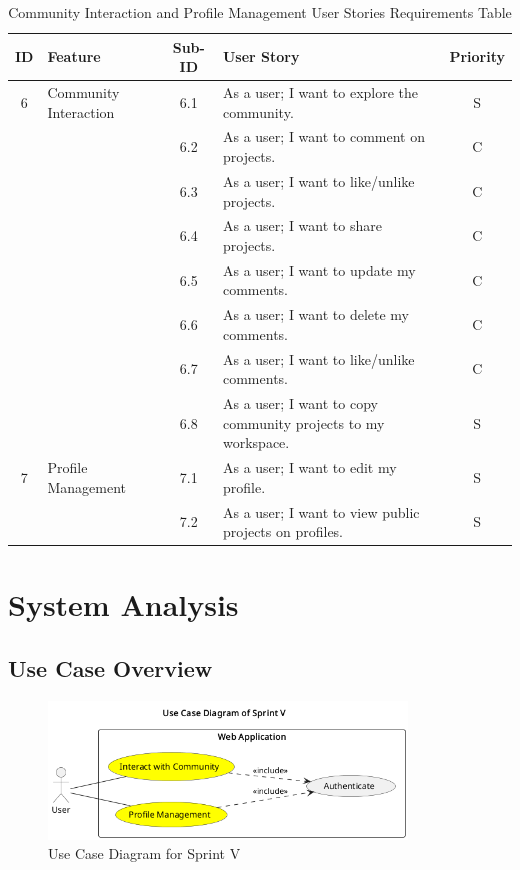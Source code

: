 \begin{table}[h]
    \centering
    \begin{tabular}{|c|l|c|p{8cm}|c|}
    \hline
    \textbf{ID} & \textbf{Feature} & \textbf{Sub-ID} & \textbf{User Story} & \textbf{Priority} \\
    \hline
    6 & Community Interaction & 6.1 & As a user; I want to explore the community. & S \\
    \hline
      &  & 6.2 & As a user; I want to comment on projects. & C \\
    \hline
      &  & 6.3 & As a user; I want to like/unlike projects. & C \\
    \hline
      &  & 6.4 & As a user; I want to share projects. & C \\
    \hline
      &  & 6.5 & As a user; I want to update my comments. & C \\
    \hline
      &  & 6.6 & As a user; I want to delete my comments. & C \\
    \hline
      &  & 6.7 & As a user; I want to like/unlike comments. & C \\
    \hline
      &  & 6.8 & As a user; I want to copy community projects to my workspace. & S \\
    \hline
    7 & Profile Management & 7.1 & As a user; I want to edit my profile. & S \\
    \hline
      &  & 7.2 & As a user; I want to view public projects on profiles. & S \\
    \hline
    \end{tabular}
    \caption{Community Interaction and Profile Management User Stories Requirements Table}
    \label{tab:community_profile}
    \end{table}
\section{System Analysis}

\subsection{Use Case Overview}

\begin{figure}[H]
\centering
\includegraphics[width=0.85\textwidth]{conception/SprintV/use_case_diagrams/use_case_diagram_of_SprintV.png}
\caption{Use Case Diagram for Sprint V}
\label{fig:use_case_sprint_v}
\end{figure}

